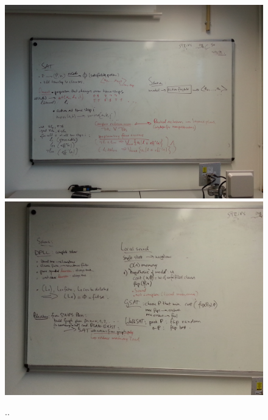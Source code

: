 \documentclass[a4paper,11pt,notitlepage]{article}
\begin{document}
\begin{figure}[ht!]
\centering
\includegraphics[width=180mm]{img/6.jpg}
\includegraphics[width=180mm]{img/7.jpg}
\caption{..}
\label{ideas}
\end{figure}
\end{document}
